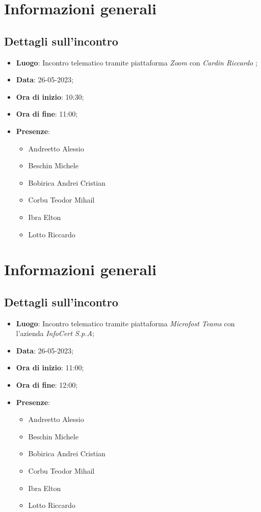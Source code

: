 \section{Informazioni generali}

\subsection{Dettagli sull'incontro}
\begin{itemize}
\item \textbf{Luogo}: Incontro telematico tramite piattaforma \textit{Zoom\glo} con \textit{Cardin Riccardo} ;
\item \textbf{Data}: 26-05-2023;
\item \textbf{Ora di inizio}: 10:30;
\item \textbf{Ora di fine}: 11:00;
\item \textbf{Presenze}: 
\begin{itemize}
	\item Andreetto Alessio
    \item Beschin Michele
    \item Bobirica Andrei Cristian
    \item Corbu Teodor Mihail
    \item Ibra Elton
    \item Lotto Riccardo
\end{itemize}
\end{itemize}

\section{Informazioni generali}

\subsection{Dettagli sull'incontro}
\begin{itemize}
\item \textbf{Luogo}: Incontro telematico tramite piattaforma \textit{Microfost Teams\glo} con l'azienda \textit{InfoCert S.p.A};
\item \textbf{Data}: 26-05-2023;
\item \textbf{Ora di inizio}: 11:00;
\item \textbf{Ora di fine}: 12:00;
\item \textbf{Presenze}: 
\begin{itemize}
	\item Andreetto Alessio
    \item Beschin Michele
    \item Bobirica Andrei Cristian
    \item Corbu Teodor Mihail
    \item Ibra Elton
    \item Lotto Riccardo
\end{itemize}
\end{itemize}



